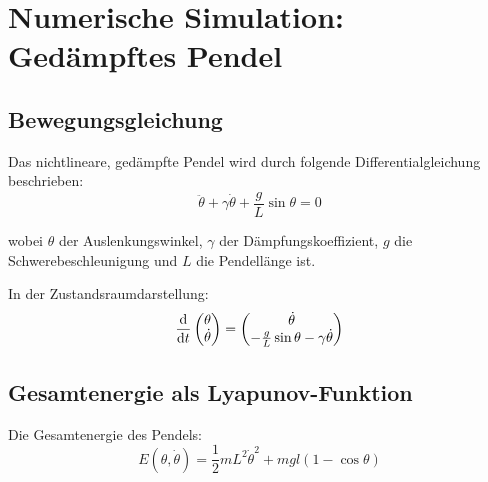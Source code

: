 ﻿\documentclass[12pt, a4paper]{report}
\theoremstyle{definition}
\theoremstyle{remark}
\begin{document}
\chapter{Numerische Simulation: Gedämpftes Pendel}
\label{sec:numerik}

\section{Bewegungsgleichung}

Das nichtlineare, gedämpfte Pendel wird durch folgende Differentialgleichung
beschrieben:
\begin{equation}
  \ddot\theta + \gamma\dot\theta + \frac{g}{L}\sin\theta = 0
  \label{eq:pendel_ode}
\end{equation}

wobei $\theta$ der Auslenkungswinkel, $\gamma$ der Dämpfungskoeffizient,
$g$ die Schwerebeschleunigung und $L$ die Pendellänge ist.

In der Zustandsraumdarstellung:
\begin{equation}
  \dv{}{t}\begin{pmatrix}\theta\\\dot\theta\end{pmatrix}
  = \begin{pmatrix}\dot\theta\\-\frac{g}{L}\sin\theta - \gamma\dot\theta\end{pmatrix}
  \label{eq:pendel_ode_state}
\end{equation}

\section{Gesamtenergie als Lyapunov-Funktion}

Die Gesamtenergie des Pendels:
\begin{equation}
  E(\theta, \dot\theta) = \frac{1}{2}mL^2\dot\theta^2 + mgl(1 - \cos\theta)
  \label{eq:pendel_energie}
\end{equation}
\end{document}

